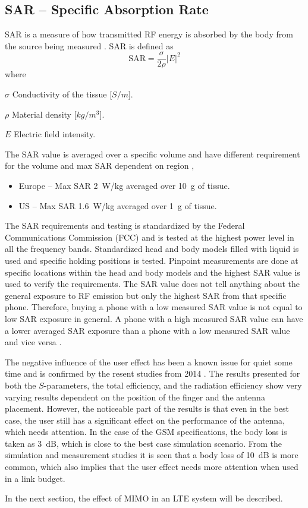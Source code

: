 \subsection{SAR -- Specific Absorption Rate}
SAR is a measure of how transmitted RF energy is absorbed by the body from the source being measured \cite{fcc2015sar}. SAR is defined as \cite{fujimoto2008mobile}
\begin{equation}
  \text{SAR} = \frac{\sigma}{2\rho}|E|^2
\end{equation}
where
\begin{where}
  \item [$\sigma$] Conductivity of the tissue [$S/m$].
  \item [$\rho$] Material density [$kg/m^3$].
  \item [$E$] Electric field intensity.
\end{where}
The SAR value is averaged over a specific volume and have different requirement for the volume and max SAR dependent on region \cite{Zhijun2011antdesign},
\begin{itemize}
\item Europe -- Max SAR \SI{2}{W/kg} averaged over \SI{10}{g} of tissue.
\item US -- Max SAR \SI{1.6}{W/kg} averaged over \SI{1}{g} of tissue.
\end{itemize}

The SAR requirements and testing is standardized by the Federal Communications Commission (FCC) and is tested at the highest power level in all the frequency bands. Standardized head and body models filled with liquid is used and specific holding positions is tested. Pinpoint measurements are done at specific locations within the head and body models and the highest SAR value is used to verify the requirements.
The SAR value does not tell anything about the general exposure to RF emission but only the highest SAR from that specific phone. Therefore, buying a phone with a low measured SAR value is not equal to low SAR exposure in general. A phone with a high measured SAR value can have a lower averaged SAR exposure than a phone with a low measured SAR value and vice versa \cite{fcc2015sar}. 

\begin{aautail}
    The negative influence of the user effect has been a known issue for quiet some time and is confirmed by the resent studies from 2014 \cite{Samantha2014UserEff}. The results presented for both the $S$-parameters, the total efficiency, and the radiation efficiency show very varying results dependent on the position of the finger and the antenna placement. However, the noticeable part of the results is that even in the best case, the user still has a significant effect on the performance of the antenna, which needs attention. In the case of the GSM specifications, the body loss is taken as \SI{3}{dB}, which is close to the best case simulation scenario. From the simulation and measurement studies it is seen that a body loss of \SI{10}{dB} is more common, which also implies that the user effect needs more attention when used in a link budget.

    In the next section, the effect of MIMO in an LTE system will be described.
\end{aautail}
